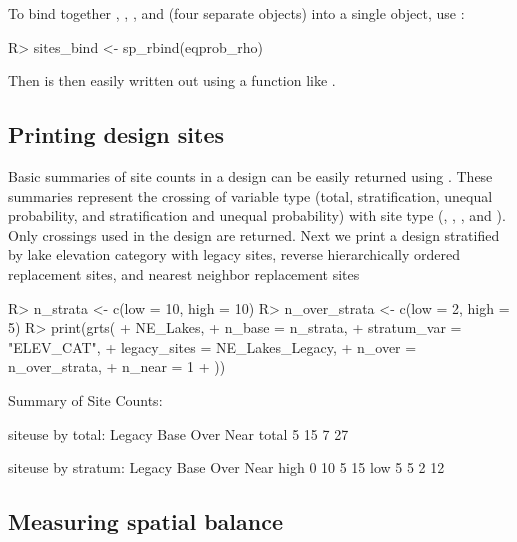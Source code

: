 \documentclass[
  shortnames]{jss}
\begin{document}
To bind together , ,
, and  (four separate 
objects) into a single  object, use :

\begin{CodeChunk}
\begin{CodeInput}
R> sites_bind <- sp_rbind(eqprob_rho)
\end{CodeInput}
\end{CodeChunk}

Then  is then easily written out using a function like
.

\hypertarget{sec:print}{%
\subsection{Printing design sites}\label{sec:print}}

Basic summaries of site counts in a design can be easily returned using
. These summaries represent the crossing of variable type
(total, stratification, unequal probability, and stratification and
unequal probability) with site type (, ,
, and ). Only crossings used in the design are
returned. Next we print a design stratified by lake elevation category
with legacy sites, reverse hierarchically ordered replacement sites, and
nearest neighbor replacement sites

\begin{CodeChunk}
\begin{CodeInput}
R> n_strata <- c(low = 10, high = 10)
R> n_over_strata <- c(low = 2, high = 5)
R> print(grts(
+   NE_Lakes,
+   n_base = n_strata,
+   stratum_var = "ELEV_CAT",
+   legacy_sites = NE_Lakes_Legacy,
+   n_over = n_over_strata,
+   n_near = 1
+ ))
\end{CodeInput}
\begin{CodeOutput}
Summary of Site Counts: 

siteuse by total: 
      Legacy Base Over Near
total      5   15    7   27

siteuse by stratum: 
     Legacy Base Over Near
high      0   10    5   15
low       5    5    2   12
\end{CodeOutput}
\end{CodeChunk}

\hypertarget{sec:spb}{%
\subsection{Measuring spatial balance}\label{sec:spb}}
\end{document}
